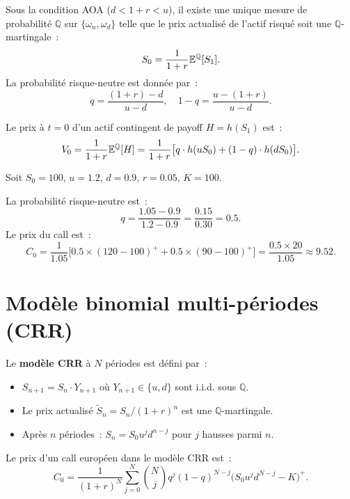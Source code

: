 \begin{theoreme}
\label{thm:risque_neutre}
Sous la condition AOA ($d < 1+r < u$), il existe une unique mesure de
probabilit\'e $\mathbb{Q}$ sur $\{\omega_u, \omega_d\}$ telle que le
prix actualis\'e de l'actif risqu\'e soit une $\mathbb{Q}$-martingale~:
\[
    S_0 = \frac{1}{1+r}\mathbb{E}^\mathbb{Q}[S_1].
\]
La probabilit\'e risque-neutre est donn\'ee par~:
\[
    q = \frac{(1+r) - d}{u - d}, \quad 1-q = \frac{u - (1+r)}{u - d}.
\]
\end{theoreme}

\begin{formules}[title=\textbf{Prix risque-neutre d'un actif contingent}]
Le prix \`a $t=0$ d'un actif contingent de payoff $H = h(S_1)$ est~:
\[
    V_0 = \frac{1}{1+r}\mathbb{E}^\mathbb{Q}[H]
        = \frac{1}{1+r}\bigl[q \cdot h(uS_0) + (1-q) \cdot h(dS_0)\bigr].
\]
\end{formules}

\begin{exemple}
Soit $S_0 = 100$, $u = 1.2$, $d = 0.9$, $r = 0.05$, $K = 100$.

La probabilit\'e risque-neutre est~:
\[
    q = \frac{1.05 - 0.9}{1.2 - 0.9} = \frac{0.15}{0.30} = 0.5.
\]
Le prix du call est~:
\[
    C_0 = \frac{1}{1.05}\bigl[0.5 \times (120-100)^+ + 0.5 \times (90-100)^+\bigr]
        = \frac{0.5 \times 20}{1.05} \approx 9.52.
\]
\end{exemple}

\section{Mod\`ele binomial multi-p\'eriodes (CRR)}

\begin{definition}
Le \textbf{mod\`ele CRR} \`a $N$ p\'eriodes est d\'efini par~:
\begin{itemize}
    \item $S_{n+1} = S_n \cdot Y_{n+1}$ o\`u $Y_{n+1} \in \{u, d\}$
          sont i.i.d. sous $\mathbb{Q}$.
    \item Le prix actualis\'e $\tilde{S}_n = S_n / (1+r)^n$ est une
          $\mathbb{Q}$-martingale.
    \item Apr\`es $n$ p\'eriodes~: $S_n = S_0 u^j d^{n-j}$ pour
          $j$ hausses parmi $n$.
\end{itemize}
\end{definition}

\begin{theoreme}
Le prix d'un call europ\'een dans le mod\`ele CRR est~:
\[
    C_0 = \frac{1}{(1+r)^N} \sum_{j=0}^{N} \binom{N}{j} q^j (1-q)^{N-j}
    \bigl(S_0 u^j d^{N-j} - K\bigr)^+.
\]
\end{theoreme}

